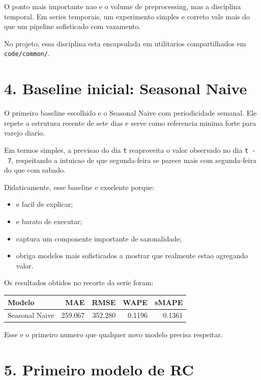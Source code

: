 \documentclass[12pt]{article}
\providecommand{\tightlist}{%
  \setlength{\itemsep}{0pt}\setlength{\parskip}{0pt}}
\begin{document}
O ponto mais importante nao e o volume de preprocessing, mas a disciplina temporal. Em series temporais, um experimento simples e correto vale mais do que um pipeline sofisticado com vazamento.

No projeto, essa disciplina esta encapsulada em utilitarios compartilhados em \texttt{code/common/}.

\section{4. Baseline inicial: Seasonal Naive}\label{4-baseline-inicial-seasonal-naive}

O primeiro baseline escolhido e o Seasonal Naive com periodicidade semanal. Ele repete a estrutura recente de sete dias e serve como referencia minima forte para varejo diario.

Em termos simples, a previsao do dia \texttt{t} reaproveita o valor observado no dia \texttt{t\ -\ 7}, respeitando a intuicao de que segunda-feira se parece mais com segunda-feira do que com sabado.

Didaticamente, esse baseline e excelente porque:

\begin{itemize}
\tightlist
\item
  e facil de explicar;
\item
  e barato de executar;
\item
  captura um componente importante de sazonalidade;
\item
  obriga modelos mais sofisticados a mostrar que realmente estao agregando valor.
\end{itemize}

Os resultados obtidos no recorte da serie foram:

\begin{longtable}[]{@{}lrrrr@{}}
\toprule\noalign{}
Modelo & MAE & RMSE & WAPE & sMAPE \\
\midrule\noalign{}
\endhead
\bottomrule\noalign{}
\endlastfoot
Seasonal Naive & 259.067 & 352.280 & 0.1196 & 0.1361 \\
\end{longtable}

Esse e o primeiro numero que qualquer novo modelo precisa respeitar.

\section{5. Primeiro modelo de RC}\label{5-primeiro-modelo-de-rc}
\end{document}
